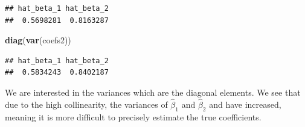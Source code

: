 \documentclass[]{book}
\newenvironment{Shaded}{\begin{snugshade}}{\end{snugshade}}
\newcommand{\CommentTok}[1]{\textcolor[rgb]{0.56,0.35,0.01}{\textit{#1}}}
\newcommand{\DataTypeTok}[1]{\textcolor[rgb]{0.13,0.29,0.53}{#1}}
\newcommand{\DecValTok}[1]{\textcolor[rgb]{0.00,0.00,0.81}{#1}}
\newcommand{\FloatTok}[1]{\textcolor[rgb]{0.00,0.00,0.81}{#1}}
\newcommand{\KeywordTok}[1]{\textcolor[rgb]{0.13,0.29,0.53}{\textbf{#1}}}
\newcommand{\NormalTok}[1]{#1}
\newcommand{\OperatorTok}[1]{\textcolor[rgb]{0.81,0.36,0.00}{\textbf{#1}}}
\newcommand{\StringTok}[1]{\textcolor[rgb]{0.31,0.60,0.02}{#1}}
\begin{document}
\begin{Shaded}
\end{Shaded}

\begin{verbatim}
## hat_beta_1 hat_beta_2 
##  0.5698281  0.8163287
\end{verbatim}

\begin{Shaded}
\begin{Highlighting}[]
\KeywordTok{diag}\NormalTok{(}\KeywordTok{var}\NormalTok{(coefs2))}
\end{Highlighting}
\end{Shaded}

\begin{verbatim}
## hat_beta_1 hat_beta_2 
##  0.5834243  0.8402187
\end{verbatim}

We are interested in the variances which are the diagonal elements. We
see that due to the high collinearity, the variances of
\(\hat{\beta}_1\) and \(\hat{\beta}_2\) and have increased, meaning it
is more difficult to precisely estimate the true coefficients.
\end{document}

